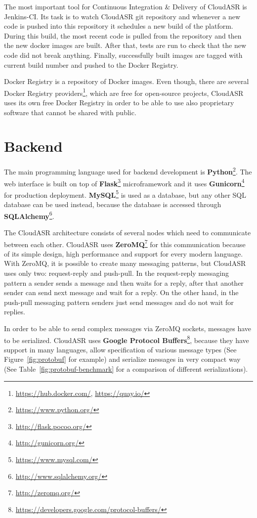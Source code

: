 The most important tool for Continuous Integration \& Delivery of CloudASR is Jenkins-CI.
Its task is to watch CloudASR git repository
  and whenever a new code is pushed into this repository it schedules a new build of the platform.
During this build, the most recent code is pulled from the repository and then the new docker images are built.
After that, tests are run to check that the new code did not break anything.
Finally, successfully built images are tagged with current build number and pushed to the Docker Registry.


Docker Registry is a repository of Docker images.
Even though, there are several Docker Registry providers\footnote{\url{https://hub.docker.com/}, \url{https://quay.io/}},
  which are free for open-source projects,
  CloudASR uses its own free Docker Registry in order to be able to use also proprietary software that cannot be shared with public.


\section{Backend}
The main programming language used for backend development is \textbf{Python}\footnote{\url{https://www.python.org/}}.
The web interface is built on top of \textbf{Flask}\footnote{\url{http://flask.pocoo.org/}} microframework
  and it uses \textbf{Gunicorn}\footnote{\url{http://gunicorn.org/}} for production deployment.
\textbf{MySQL}\footnote{\url{https://www.mysql.com/}} is used as a database,
  but any other SQL database can be used instead,
  because the database is accessed  through \textbf{SQLAlchemy}\footnote{\url{http://www.sqlalchemy.org/}}.

The CloudASR architecture consists of several nodes which need to communicate between each other.
CloudASR uses \textbf{ZeroMQ}\footnote{\url{http://zeromq.org/}} for this communication
  because of its simple design, high performance and support for every modern language.
With ZeroMQ,
  it is possible to create many messaging patterns,
  but CloudASR uses only two: request-reply and push-pull.
In the request-reply messaging pattern a sender sends a message and then waits for a reply,
  after that another sender can send next message and wait for a reply.
On the other hand, in the push-pull messaging pattern senders just send messages and do not wait for replies.


In order to be able to send complex messages via ZeroMQ sockets, messages have to be serialized.
CloudASR uses \textbf{Google Protocol Buffers}\footnote{\url{https://developers.google.com/protocol-buffers/}},
  because they have support in many languages,
  allow specification of various message types (See Figure~\ref{fig:protobuf} for example)
  and serialize messages in very compact way
  (See Table~\ref{fig:protobuf-benchmark} for a comparison of different serializations).

